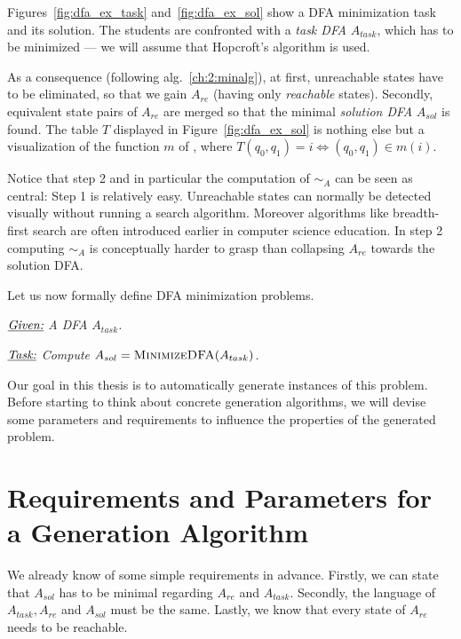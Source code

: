 \noindent Figures~\ref{fig:dfa_ex_task} and~\ref{fig:dfa_ex_sol} show a DFA minimization task and its solution. The students are confronted with a \emph{task DFA} $A_{task}$, which has to be minimized --- we will assume that Hopcroft's algorithm is used.

As a consequence (following alg.~\ref{ch:2:minalg}), at first, unreachable states have to be eliminated, so that we gain $A_{re}$ (having only \emph{reachable} states). Secondly, equivalent state pairs of $A_{re}$ are merged so that the minimal \emph{solution DFA} $A_{sol}$ is found. The table $T$ displayed in Figure~\ref{fig:dfa_ex_sol} is nothing else but a visualization of the function $m$ of \mCompDist, where $T(q_0, q_1) = i \Leftrightarrow (q_0, q_1) \in m(i)$.

Notice that step 2 and in particular the computation of $\sim_A$ can be seen as central: Step 1 is relatively easy. Unreachable states can normally be detected visually without running a search algorithm. Moreover algorithms like breadth-first search are often introduced earlier in computer science education. In step 2 computing $\sim_A$ is conceptually harder to grasp than collapsing $A_{re}$ towards the solution DFA.

Let us now formally define DFA minimization problems.
\begin{definition}[DFAMinimization] $ $ \\
	$ $ \vspace{-0.4cm} \\
	\noindent $\underline{\emph{Given:}}$ \emph{A DFA $A_{task}$.}
	
	\vspace{0.2cm}
	\noindent $\underline{\emph{Task:}}$ \emph{Compute $A_{sol} = \textsc{MinimizeDFA}(A_{task})$.}
\end{definition}
\noindent Our goal in this thesis is to automatically generate instances of this problem. Before starting to think about concrete generation algorithms, we will devise some parameters and requirements to influence the properties of the generated problem.

\section{Requirements and Parameters for a Generation Algorithm}\label{ch:2:requirements-analysis}

We already know of some simple requirements in advance. Firstly, we can state that $A_{sol}$ has to be minimal regarding $A_{re}$ and $A_{task}$. Secondly, the language of $A_{task}, A_{re}$ and $A_{sol}$ must be the same. Lastly, we know that every state of $A_{re}$ needs to be reachable.

